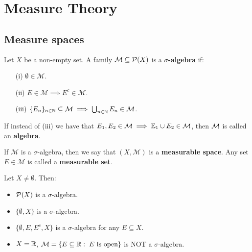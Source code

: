 \chapter{Measure Theory}

\section{Measure spaces}

\begin{fdefinition}
    Let $X$ be a non-empty set. A family $\mathcal{M} \subseteq \mathcal{P}(X)$ is a
    \textbf{$\sigma$-algebra} if:

    \vspace{1em}

    \begin{enumerate}
        \item[(i)] $\emptyset \in \mathcal{M}$.
        \item[(ii)] $E \in \mathcal{M} \implies E^c \in \mathcal{M}$.
        \item[(iii)] $\{E_n\}_{n \in \mathbb{N}} \subseteq \mathcal{M} \implies \bigcup_{n \in \mathbb{N}} E_n \in \mathcal{M}$.
    \end{enumerate}

    \vspace{1em}

    If instead of (iii) we have that $E_1, E_2 \in \mathcal{M} \implies \mathbb{E}_1 \cup E_2 \in \mathcal{M}$, then
    $\mathcal{M}$ is called an \textbf{algebra}.

\end{fdefinition}

\begin{fnote}
    If $\mathcal{M}$ is a $\sigma$-algebra, then we say that $(X, \mathcal{M})$ is a
    \textbf{measurable space}. Any set $E \in \mathcal{M}$ is called a
    \textbf{measurable set}.
\end{fnote}

\begin{example}
    Let $X \neq \emptyset$. Then:

    \begin{itemize}
        \item $\mathcal{P}(X)$ is a $\sigma$-algebra.
        \item $\{\emptyset, X\}$ is a $\sigma$-algebra.
        \item $\{\emptyset, E, E^c, X\}$ is a $\sigma$-algebra for any $E \subseteq X$.
        \item $X = \mathbb{R}$, $\mathcal{M} = \{E \subseteq \mathbb{R}: \; E \text{ is open}\}$ is NOT a $\sigma$-algebra.
    \end{itemize}
\end{example}

